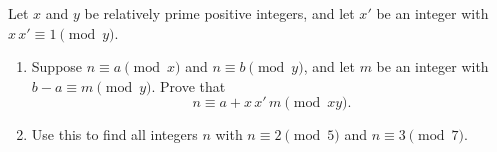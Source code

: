 Let $x$ and $y$ be relatively prime positive integers, and let $x'$ be an integer with $x\,x'\equiv1\pmod y$.
\begin{enumerate}
\item[(a)] Suppose $n\equiv a\pmod x$ and $n\equiv b\pmod y$, and let $m$ be an integer with $b-a\equiv m\pmod y$. Prove that
\[n\equiv a+x\,x'\,m\pmod{xy}.\]
\item[(b)] Use this to find all integers $n$ with $n\equiv2\pmod5$ and $n\equiv3\pmod7$.
\end{enumerate}

